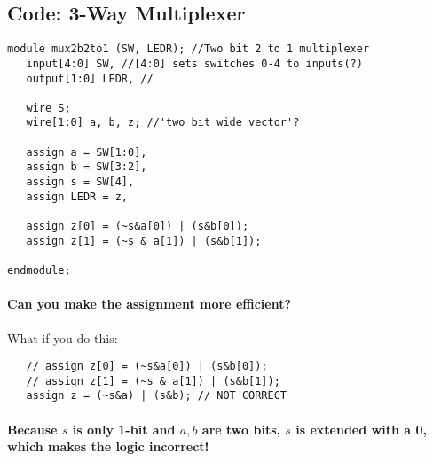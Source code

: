 \documentclass[a4paper,12pt]{report}
\begin{document}
\subsection{Code: 3-Way Multiplexer}


\begin{lstlisting}
module mux2b2to1 (SW, LEDR); //Two bit 2 to 1 multiplexer  
   input[4:0] SW, //[4:0] sets switches 0-4 to inputs(?)
   output[1:0] LEDR, //

   wire S;
   wire[1:0] a, b, z; //'two bit wide vector'?

   assign a = SW[1:0],
   assign b = SW[3:2],
   assign s = SW[4],
   assign LEDR = z,

   assign z[0] = (~s&a[0]) | (s&b[0]);
   assign z[1] = (~s & a[1]) | (s&b[1]);

endmodule;
\end{lstlisting}

\paragraph{Can you make the assignment more efficient?}
What if you do this:
\begin{lstlisting}
   // assign z[0] = (~s&a[0]) | (s&b[0]);
   // assign z[1] = (~s & a[1]) | (s&b[1]);
   assign z = (~s&a) | (s&b); // NOT CORRECT
\end{lstlisting}

\paragraph{Because $s$ is only 1-bit and $a, b$ are two bits, $s$ is extended with a \textbf{0}, 
which makes the logic incorrect!}
\end{document}

